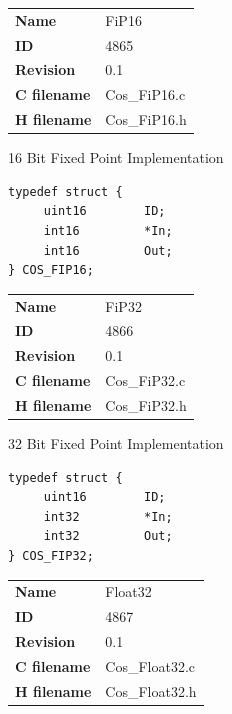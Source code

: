 \ifdefined \AddTestReports
{}
\fi
{}
\nopagebreak[0]
\begin{tabular}{l l}
\textbf{Name} & FiP16 \tabularnewline
\textbf{ID} & 4865 \tabularnewline
\textbf{Revision} & 0.1 \tabularnewline
\textbf{C filename} & Cos\_FiP16.c \tabularnewline
\textbf{H filename} & Cos\_FiP16.h \tabularnewline
\end{tabular}
\vspace{1ex}

16 Bit Fixed Point Implementation

\begin{lstlisting}
typedef struct {
     uint16        ID;
     int16         *In;
     int16         Out;
} COS_FIP16;
\end{lstlisting}

\ifdefined \AddTestReports
{}
\fi
{}
\nopagebreak[0]
\begin{tabular}{l l}
\textbf{Name} & FiP32 \tabularnewline
\textbf{ID} & 4866 \tabularnewline
\textbf{Revision} & 0.1 \tabularnewline
\textbf{C filename} & Cos\_FiP32.c \tabularnewline
\textbf{H filename} & Cos\_FiP32.h \tabularnewline
\end{tabular}
\vspace{1ex}

32 Bit Fixed Point Implementation

\begin{lstlisting}
typedef struct {
     uint16        ID;
     int32         *In;
     int32         Out;
} COS_FIP32;
\end{lstlisting}

\ifdefined \AddTestReports
{}
\fi
{}
\nopagebreak[0]
\begin{tabular}{l l}
\textbf{Name} & Float32 \tabularnewline
\textbf{ID} & 4867 \tabularnewline
\textbf{Revision} & 0.1 \tabularnewline
\textbf{C filename} & Cos\_Float32.c \tabularnewline
\textbf{H filename} & Cos\_Float32.h \tabularnewline
\end{tabular}
\vspace{1ex}

